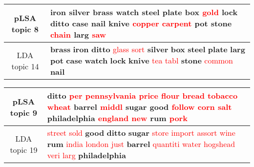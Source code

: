 \begin{center}\begin{tabularx}{\textwidth} {
  | c | >{\raggedright\arraybackslash}X | } \hline 
pLSA topic 8 & \textbf{iron} \textbf{silver} \textbf{brass} \textbf{watch} \textbf{steel} \textbf{plate} \textbf{box} \textcolor{red}{gold} \textbf{lock} \textbf{ditto} \textbf{case} \textbf{nail} \textbf{knive} \textcolor{red}{copper} \textcolor{red}{carpent} \textbf{pot} \textbf{stone} \textcolor{red}{chain} \textbf{larg} \textcolor{red}{saw} \\ \hline 
LDA topic 14 & \textbf{brass} \textbf{iron} \textbf{ditto} \textcolor{red}{glass} \textcolor{red}{sort} \textbf{silver} \textbf{box} \textbf{steel} \textbf{plate} \textbf{larg} \textbf{pot} \textbf{case} \textbf{watch} \textbf{lock} \textbf{knive} \textcolor{red}{tea} \textcolor{red}{tabl} \textbf{stone} \textcolor{red}{common} \textbf{nail} \\ \hline 
\end{tabularx}

\end{center}

\begin{center}\begin{tabularx}{\textwidth} {
  | c | >{\raggedright\arraybackslash}X | } \hline 
pLSA topic 9 & \textbf{ditto} \textcolor{red}{per} \textcolor{red}{pennsylvania} \textcolor{red}{price} \textcolor{red}{flour} \textcolor{red}{bread} \textcolor{red}{tobacco} \textcolor{red}{wheat} \textbf{barrel} \textcolor{red}{middl} \textbf{sugar} \textbf{good} \textcolor{red}{follow} \textcolor{red}{corn} \textcolor{red}{salt} \textbf{philadelphia} \textcolor{red}{england} \textcolor{red}{new} \textbf{rum} \textcolor{red}{pork} \\ \hline 
LDA topic 19 & \textcolor{red}{street} \textcolor{red}{sold} \textbf{good} \textbf{ditto} \textbf{sugar} \textcolor{red}{store} \textcolor{red}{import} \textcolor{red}{assort} \textcolor{red}{wine} \textbf{rum} \textcolor{red}{india} \textcolor{red}{london} \textcolor{red}{just} \textbf{barrel} \textcolor{red}{quantiti} \textcolor{red}{water} \textcolor{red}{hogshead} \textcolor{red}{veri} \textcolor{red}{larg} \textbf{philadelphia} \\ \hline 
\end{tabularx}

\end{center}


